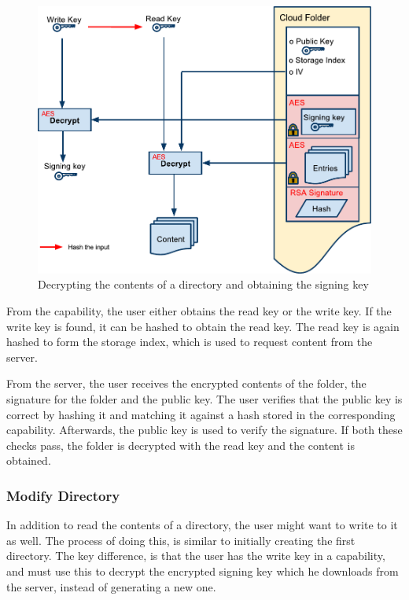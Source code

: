 \documentclass[pdftex,english,10pt,b5paper,twoside]{book}
\begin{document}
\begin{figure}[h!]
    \centering
    \includegraphics[width=\columnwidth]{CryptoOpenFolder.pdf}
    \caption{Decrypting the contents of a directory and obtaining the signing
    key}
    \label{fig:CS:OD}
\end{figure}

From the capability, the user either obtains the read key or the write key. If
the write key is found, it can be hashed to obtain the read key. The read key
is again hashed to form the storage index, which is used to request content
from the server.

From the server, the user receives the encrypted contents of the folder, the
signature for the folder and the public key. The user verifies that the public
key is correct by hashing it and matching it against a hash stored in the
corresponding capability. Afterwards, the public key is used to verify the
signature. If both these checks pass, the folder is decrypted with the
read key and the content is obtained.

\subsubsection{Modify Directory}

In addition to read the contents of a directory, the user might want to write
to it as well. The process of doing this, is similar to initially creating the
first directory. The key difference, is that the user has the write key in a
capability, and must use this to decrypt the encrypted signing key which he
downloads from the server, instead of generating a new one.
\end{document}
